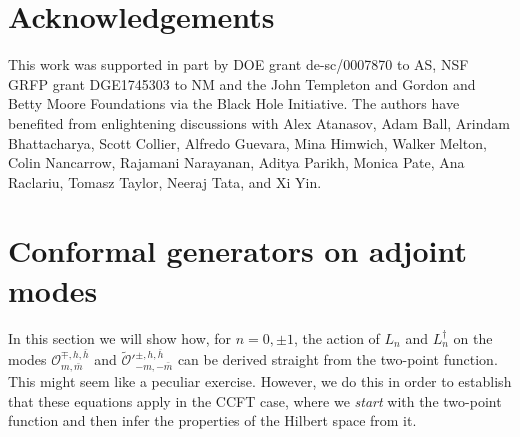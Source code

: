 \documentclass[11pt]{article}
\numberwithin{equation}{section}
\begin{document}
%
%
%
%
%






\section*{Acknowledgements}
This work was supported in part by DOE grant de-sc/0007870 to AS, NSF GRFP grant DGE1745303 to NM and the John Templeton and Gordon and Betty Moore Foundations via the Black Hole Initiative. The authors have benefited from enlightening discussions with Alex Atanasov, Adam Ball, Arindam Bhattacharya, Scott Collier, Alfredo Guevara, Mina Himwich, Walker Melton, Colin Nancarrow, Rajamani Narayanan, Aditya Parikh, Monica Pate, Ana Raclariu, Tomasz Taylor, Neeraj Tata, and Xi Yin. 




\appendix



\section{Conformal generators on adjoint modes}\label{app:ln}
In this section we will show how, for $n = 0, \pm 1$, the action of $L_n$ and $L_n^\dagger$ on the modes $\mathcal{O}^{\mp,h, \bar{h}}_{m, \bar m}$ and $\widetilde{\mathcal{O}}'^{\pm,h, \bar{h}}_{-m, -\bar m}$ can be derived straight from the two-point function. This might seem like a peculiar exercise. However, we do this in order to establish that these equations apply in the CCFT case, where we \textit{start} with the two-point function and then infer the properties of the Hilbert space from it.
\end{document}
